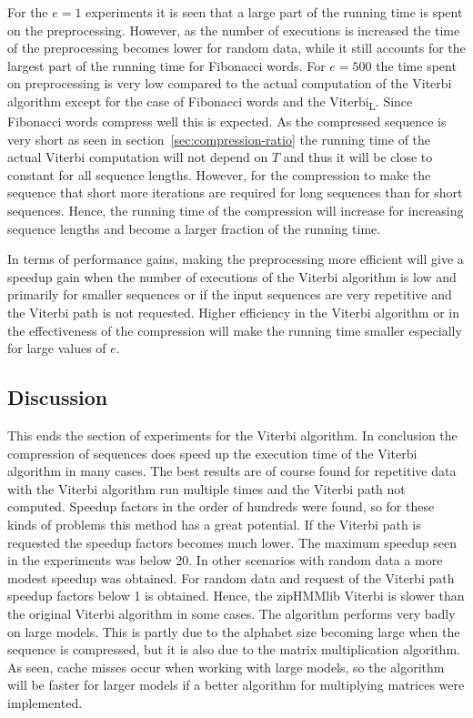 For the $e = 1$ experiments it is seen that a large part of the running time is
spent on the preprocessing. However, as the number of executions is increased
the time of the preprocessing becomes lower for random data, while it still
accounts for the largest part of the running time for Fibonacci words. For $e = 500$
the time spent on preprocessing is very low compared to the actual computation
of the Viterbi algorithm except for the case of Fibonacci words and the
Viterbi\textsubscript{L}. Since Fibonacci words compress well this is expected.
As the compressed sequence is very short as seen in
section~\ref{sec:compression-ratio} the running time of the actual Viterbi
computation will not depend on $T$ and thus it will be close to constant for
all sequence lengths. However, for the compression to make the sequence that
short more iterations are required for long sequences than for short sequences.
Hence, the running time of the compression will increase for increasing
sequence lengths and become a larger fraction of the running time.

In terms of performance gains, making the preprocessing more efficient will
give a speedup gain when the number of executions of the Viterbi algorithm is
low and primarily for smaller sequences or if the input sequences are very
repetitive and the Viterbi path is not requested. Higher efficiency in the
Viterbi algorithm or in the effectiveness of the compression will make the
running time smaller especially for large values of $e$.

\subsection{Discussion}

This ends the section of experiments for the Viterbi algorithm. In
conclusion the compression of sequences does speed up the execution time of the
Viterbi algorithm in many cases. The best results are of course found for
repetitive data with the Viterbi algorithm run multiple times and the Viterbi
path not computed. Speedup factors in the order of hundreds were found, so
for these kinds of problems this method has a great potential. If the Viterbi
path is requested the speedup factors becomes much lower. The maximum speedup
seen in the experiments was below 20. In other scenarios with random data a
more modest speedup was obtained. For random data and request of the Viterbi
path speedup factors below 1 is obtained. Hence, the zipHMMlib Viterbi is slower
than the original Viterbi algorithm in some cases. The algorithm performs very
badly on large models. This is partly due to the alphabet size becoming large
when the sequence is compressed, but it is also due to the matrix
multiplication algorithm. As seen, cache misses occur when working with large
models, so the algorithm will be faster for larger models if a better algorithm
for multiplying matrices were implemented.

